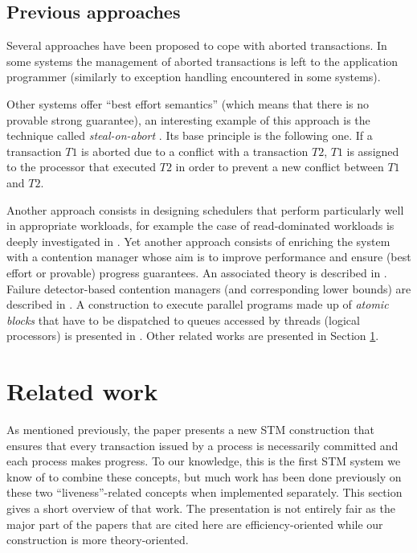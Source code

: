 \subsection{Previous approaches}


Several approaches have been proposed to cope with  aborted transactions.
In some systems the  management of aborted transactions
is left to the application programmer (similarly to  exception handling
encountered  in  some systems). 
%

Other systems  offer   ``best effort semantics'' 
(which  means that there is no provable  strong guarantee),
an interesting example of this approach is the  technique
called  {\it steal-on-abort} \cite{ALKJKW09}. 
 Its  base principle is the  following one.  If  a transaction $T1$
is  aborted  due to  a  conflict with a transaction  $T2$,  $T1$ is
assigned to  the processor  that executed  $T2$ in order  to prevent  
a new conflict between   $T1$ and  $T2$. 

Another approach consists in designing  schedulers that perform 
particularly well in appropriate workloads, for example the case of
read-dominated workloads is deeply investigated in \cite{AM09}.
%
Yet another approach consists of enriching the system with a 
contention manager whose aim is to  improve performance and
ensure (best effort or provable) progress guarantees. 
An associated theory is described in \cite{GHP05}. 
Failure detector-based contention managers (and corresponding 
lower bounds) are described in \cite{GKK08}. 
A construction to execute  parallel programs made up of {\it atomic blocks} 
that have to be dispatched to queues accessed by threads (logical processors) 
is presented in \cite{WF10}. 
%
Other related works are presented in Section \ref{sec:related-work}.






\section{Related work}
\label{sec:related-work}

As mentioned previously, the paper   presents a  new STM construction  that
ensures that every  
transaction issued by a process is necessarily committed and  each process 
makes progress. To  our knowledge,  this  is the  first STM  system 
we  know of  to combine  these
concepts, but much work has been done previously on these two 
``liveness''-related concepts when 
implemented separately. This  section gives  a short  overview of that work.
The presentation is not entirely fair as  the major part of the papers 
that are cited here are efficiency-oriented while our construction is
more theory-oriented.  



